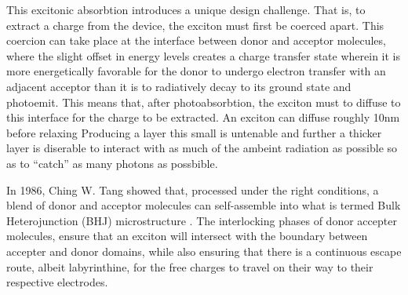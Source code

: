 This excitonic absorbtion introduces a unique design challenge.
That is, to extract a charge from the device, the exciton
must first be coerced apart. This coercion can take place at the interface between donor and acceptor molecules,
where the slight offset in energy levels creates a charge transfer state wherein it is more
energetically favorable for the donor to undergo electron transfer with an adjacent acceptor than
it is to radiatively decay to its ground state and photoemit.
This means that, after photoabsorbtion, the exciton must to diffuse to this interface for the charge to be
extracted. An exciton can diffuse roughly 10nm before relaxing \cite{clarke2010} 
Producing a layer this small is untenable and further a thicker layer
is diserable to interact with as much of the ambeint radiation as possible so as to ``catch'' as many photons
as possbible. 

In 1986, Ching W. Tang
showed that, processed under the right conditions, a blend of donor and acceptor molecules can self-assemble
into what is termed Bulk Heterojunction (BHJ) microstructure \cite{Tang1986c}. 
The interlocking phases of donor accepter molecules, ensure
that an exciton will intersect with the boundary between accepter and donor domains, while also ensuring that
there
is a continuous escape route, albeit labyrinthine, for the free charges to travel on their way to their respective
electrodes. 


